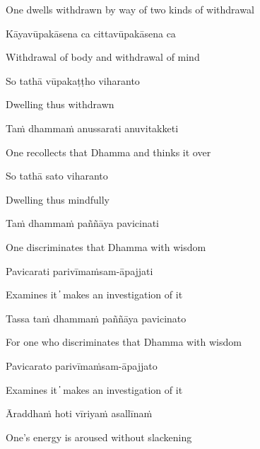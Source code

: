 \begin{cprenglish}
  One dwells withdrawn by way of two kinds of withdrawal
\end{cprenglish}

Kāyavūpakāsena ca cittavūpakāsena ca

\begin{cprenglish}
  Withdrawal of body and withdrawal of mind
\end{cprenglish}

So tathā vūpakaṭṭho viharanto

\begin{cprenglish}
  Dwelling thus withdrawn
\end{cprenglish}

Taṁ dhammaṁ anussarati anuvitakketi

\begin{cprenglish}
  One recollects that Dhamma and thinks it over
\end{cprenglish}

So tathā sato viharanto

\begin{cprenglish}
  Dwelling thus mindfully
\end{cprenglish}

Taṁ dhammaṁ paññāya pavicinati

\begin{cprenglish}
  One discriminates that Dhamma with wisdom
\end{cprenglish}

Pavicarati parivīmaṁsam-āpajjati

\begin{cprenglish}
  Examines it  ̓  makes an investigation of it
\end{cprenglish}

Tassa taṁ dhammaṁ paññāya pavicinato

\begin{cprenglish}
  For one who discriminates that Dhamma with wisdom
\end{cprenglish}

Pavicarato parivīmaṁsam-āpajjato

\begin{cprenglish}
  Examines it  ̓  makes an investigation of it
\end{cprenglish}

Āraddhaṁ hoti vīriyaṁ asallīnaṁ

\begin{cprenglish}
  One’s energy is aroused without slackening
\end{cprenglish}


